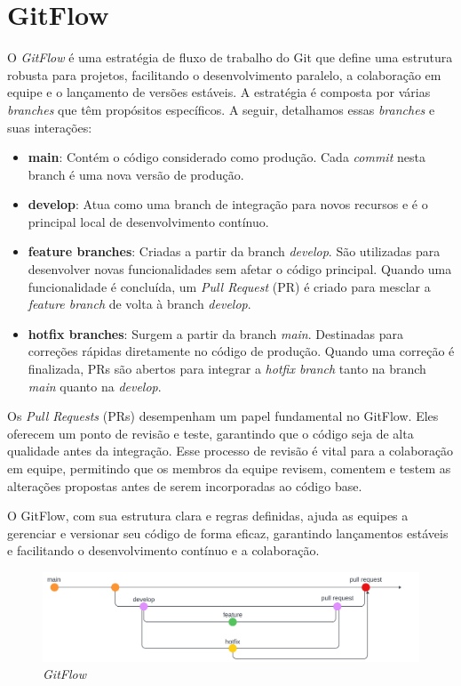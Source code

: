 \section{GitFlow}
O \textit{GitFlow} é uma estratégia de fluxo de trabalho do Git que define uma estrutura robusta para projetos, facilitando o desenvolvimento paralelo, a colaboração em equipe e o lançamento de versões estáveis. A estratégia é composta por várias \textit{branches} que têm propósitos específicos. A seguir, detalhamos essas \textit{branches} e suas interações:

\begin{itemize}
	\item \textbf{main}: Contém o código considerado como produção. Cada \textit{commit} nesta branch é uma nova versão de produção.

	\item \textbf{develop}: Atua como uma branch de integração para novos recursos e é o principal local de desenvolvimento contínuo.

	\item \textbf{feature branches}: Criadas a partir da branch \textit{develop}. São utilizadas para desenvolver novas funcionalidades sem afetar o código principal. Quando uma funcionalidade é concluída, um \textit{Pull Request} (PR) é criado para mesclar a \textit{feature branch} de volta à branch \textit{develop}.

	\item \textbf{hotfix branches}: Surgem a partir da branch \textit{main}. Destinadas para correções rápidas diretamente no código de produção. Quando uma correção é finalizada, PRs são abertos para integrar a \textit{hotfix branch} tanto na branch \textit{main} quanto na \textit{develop}.
\end{itemize}

Os \textit{Pull Requests} (PRs) desempenham um papel fundamental no GitFlow. Eles oferecem um ponto de revisão e teste, garantindo que o código seja de alta qualidade antes da integração. Esse processo de revisão é vital para a colaboração em equipe, permitindo que os membros da equipe revisem, comentem e testem as alterações propostas antes de serem incorporadas ao código base.

O GitFlow, com sua estrutura clara e regras definidas, ajuda as equipes a gerenciar e versionar seu código de forma eficaz, garantindo lançamentos estáveis e facilitando o desenvolvimento contínuo e a colaboração.

\begin{figure}[ht]
	\centering
	\includegraphics[width=1\linewidth]{Textuais/images/gitflow.png}
	\caption{\textit{GitFlow}}
	\label{fig:enter-label}
\end{figure}

